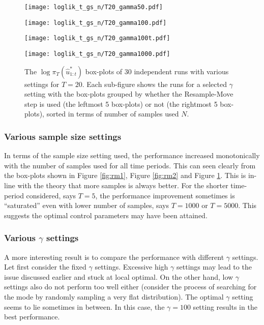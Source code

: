 \begin{figure}[!thbp]
    \centering
    \begin{minipage}{0.5\textwidth}
        \centering
        \texttt{[image: loglik\_t\_gs\_n/T20\_gamma50.pdf]}
    \end{minipage}%
    \begin{minipage}{0.5\textwidth}
        \centering
        \texttt{[image: loglik\_t\_gs\_n/T20\_gamma100.pdf]}
    \end{minipage}
    \begin{minipage}{0.5\textwidth}
        \centering
        \texttt{[image: loglik\_t\_gs\_n/T20\_gamma100t.pdf]}
    \end{minipage}%
    \begin{minipage}{0.5\textwidth}
        \centering
        \texttt{[image: loglik\_t\_gs\_n/T20\_gamma1000.pdf]}
    \end{minipage}
    \caption{The $\log\pi_T(\hat{u}^*_{1:t})$ box-plots of 30 independent runs with various settings for $T=20$. Each sub-figure shows the runs for a selected $\gamma$ setting with the box-plots grouped by whether the Resample-Move step is used (the leftmost 5 box-plots) or not (the rightmost 5 box-plots), sorted in terms of number of samples used $N$.}
    \label{fig:rm3}
\end{figure}

\subsubsection{Various sample size settings}
In terms of the sample size setting used, the performance increased monotonically with the number of samples used for all time periods. This can seen clearly from the box-plots shown in Figure \ref{fig:rm1}, Figure \ref{fig:rm2} and Figure \ref{fig:rm3}. This is in-line with the theory that more samples is always better. For the shorter time-period considered, says $T=5$, the performance improvement sometimes is ``saturated'' even with lower number of samples, says $T=1000$ or $T=5000$. This suggests the optimal control parameters may have been attained.

 \subsubsection{Various $\gamma$ settings}
A more interesting result is to compare the performance with different $\gamma$ settings. Let first consider the fixed $\gamma$ settings. Excessive high $\gamma$ settings may lead to the issue discussed earlier and stuck at local optimal. On the other hand, low $\gamma$ settings also do not perform too well either (consider the process of searching for the mode by randomly sampling a very flat distribution). The optimal $\gamma$ setting seems to lie sometimes in between. In this case, the $\gamma=100$ setting results in the best performance.

